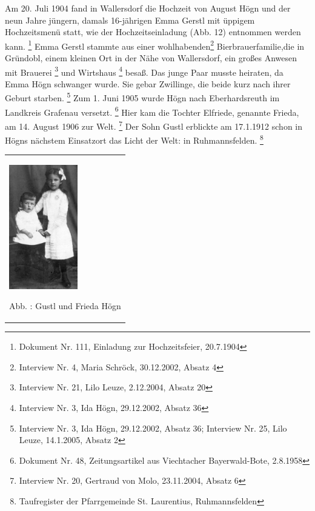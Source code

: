 Am 20. Juli 1904 fand in Wallersdorf die Hochzeit von August Högn und
der neun Jahre jüngern, damals 16-jährigen Emma Gerstl mit üppigem
Hochzeitsmenü statt, wie der Hochzeitseinladung (Abb. 12) entnommen
werden kann. \footnote{Dokument Nr. 111, Einladung zur Hochzeitsfeier,
20.7.1904} Emma Gerstl stammte aus einer wohlhabenden\footnote{
Interview Nr. 4, Maria Schröck, 30.12.2002, Absatz 4}
Bierbrauerfamilie,die in Gründobl, einem
kleinen Ort in der Nähe von Wallersdorf, ein großes Anwesen mit
Brauerei \footnote{Interview Nr. 21, Lilo Leuze, 2.12.2004, Absatz 20}
und Wirtshaus \footnote{Interview Nr. 3, Ida Högn, 29.12.2002, Absatz
36} besaß. Das junge Paar musste heiraten, da Emma Högn schwanger
wurde. Sie gebar Zwillinge, die beide kurz nach ihrer Geburt
starben. \footnote{Interview Nr. 3, Ida Högn, 29.12.2002, Absatz 36;
Interview Nr. 25, Lilo Leuze, 14.1.2005, Absatz 2} Zum 1. Juni 1905
wurde Högn nach Eberhardsreuth im Landkreis Grafenau
versetzt. \footnote{Dokument Nr. 48, Zeitungsartikel aus Viechtacher
Bayerwald-Bote, 2.8.1958} Hier kam die Tochter Elfriede, genannte
Frieda, am 14. August 1906 zur Welt. \footnote{Interview Nr. 20,
Gertraud von Molo, 23.11.2004, Absatz 6} Der Sohn Gustl erblickte am
17.1.1912 schon in Högns nächstem Einsatzort das Licht der Welt: in
Ruhmannsfelden. \footnote{Taufregister der Pfarrgemeinde St.
Laurentius, Ruhmannsfelden}

\begin{center}
\begin{minipage}{3.373cm}
\begin{center}
\tablefirsthead{}
\tablehead{}
\tabletail{}
\tablelasttail{}
\begin{supertabular}{m{3.1729999cm}}

\includegraphics[width=2.99cm,height=5.408cm]{pictures/zulassungsarbeit-img015.jpg}

Abb. : Gustl und Frieda Högn\\
\end{supertabular}
\end{center}
\end{minipage}
\end{center}
